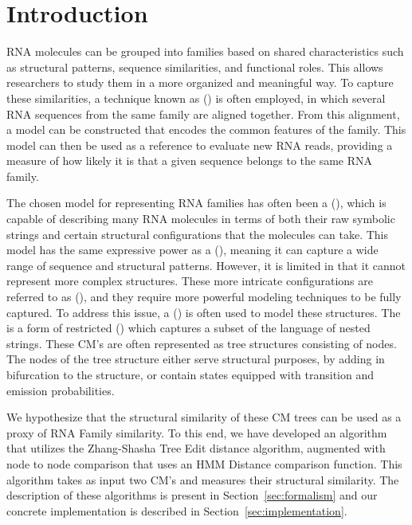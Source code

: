 \section{Introduction}
\label{sec:introduction}

RNA molecules can be grouped into families based on shared characteristics such as structural patterns, sequence similarities, and functional roles. This allows researchers to study them in a more organized and meaningful way.  
To capture these similarities, a technique known as \mra{} (\mraabv{}) is often employed, in which several RNA sequences from the same family are aligned together.  
From this alignment, a model can be constructed that encodes the common features of the family. This model can then be used as a reference to evaluate new RNA reads, providing a measure of how likely it is that a given sequence belongs to the same RNA family.  

The chosen model for representing RNA families has often been a \smm{} (\smmabv{}), which is capable of describing many RNA molecules in terms of both their raw symbolic strings and certain structural configurations that the molecules can take.  
This model has the same expressive power as a \srg{} (\srgabv{}), meaning it can capture a wide range of sequence and structural patterns.  
However, it is limited in that it cannot represent more complex structures.  
These more intricate configurations are referred to as \sss{} (\sssabv{}), and they require more powerful modeling techniques to be fully captured.  
To address this issue, a \cm (\cmabv) is often used to model these structures. The \cmabv is a form of restricted \scfg (\scfgabv) which captures a subset of the
language of nested strings. These CM's are often represented as tree structures consisting of nodes. The nodes of the tree structure
either serve structural purposes, by adding in bifurcation to the structure, or contain states equipped with transition and emission probabilities.

We hypothesize that the structural similarity of these CM trees can be used as a proxy of RNA Family similarity. To this 
end, we have developed an algorithm that utilizes the Zhang-Shasha Tree Edit distance algorithm, augmented with node to node comparison that uses an HMM Distance comparison 
function. This algorithm takes as input two CM's and measures their structural similarity.
The description of these algorithms is present in Section~\ref{sec:formalism} and our concrete implementation is described in Section~\ref{sec:implementation}.

